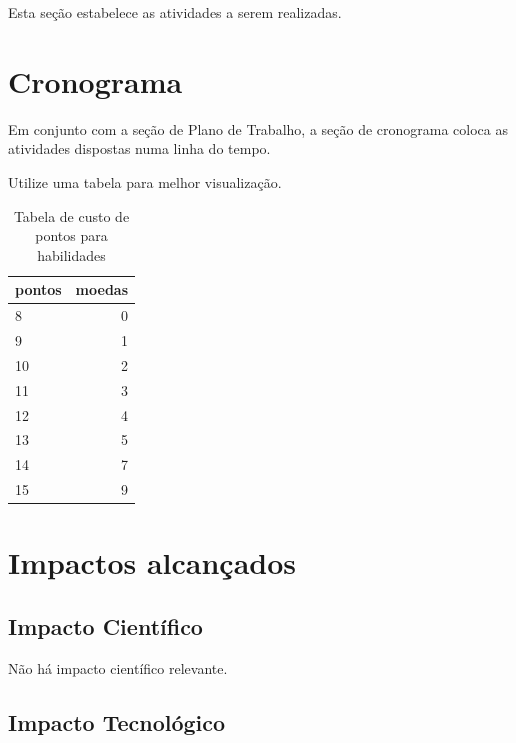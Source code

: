 \documentclass[a4paper,10pt]{article}  %
\begin{document}
 Esta seção estabelece as atividades a serem realizadas.


\section{Cronograma}

   Em conjunto com a seção de Plano de Trabalho, a seção de cronograma coloca as atividades dispostas numa linha do tempo.


   Utilize uma tabela para melhor visualização.

\begin{table}
\begin{center}
 \caption{Tabela de custo de pontos para habilidades}
\begin{tabular}{|l|r|}
  \hline \hline
  pontos & moedas \\ \hline \hline
   8 & 0 \\ \hline
   9 & 1 \\ \hline
  10 & 2 \\ \hline
  11 & 3 \\ \hline
  12 & 4 \\ \hline
  13 & 5 \\ \hline
  14 & 7 \\ \hline
  15 & 9 \\ \hline \hline
\end{tabular} 
\label{tab:resultados}
\end{center}
\end{table}


\section{Impactos alcançados } %

 \subsection{Impacto Científico}

 Não há impacto científico relevante.

 \subsection{Impacto Tecnológico}
\end{document}
